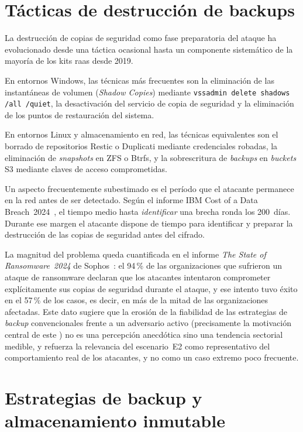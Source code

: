 \documentclass[../main.tex]{subfiles}
\begin{document}
\section{Tácticas de destrucción de backups}
\label{sec:destruccion-backups}

La destrucción de copias de seguridad como fase preparatoria del ataque
ha evolucionado desde una táctica ocasional hasta un componente sistemático
de la mayoría de los kits \gls{raas} desde 2019.

En entornos Windows, las técnicas más frecuentes son la eliminación de las
instantáneas de volumen (\textit{Shadow Copies}) mediante \texttt{vssadmin
delete shadows /all /quiet}, la desactivación del servicio de copia de
seguridad y la eliminación de los puntos de restauración del sistema.

En entornos Linux y almacenamiento en red, las técnicas equivalentes son
el borrado de repositorios Restic o Duplicati mediante credenciales robadas,
la eliminación de \textit{snapshots} en ZFS o Btrfs, y la sobrescritura de
\textit{backups} en \textit{buckets} S3 mediante claves de acceso
comprometidas.

Un aspecto frecuentemente subestimado es el período que el atacante
permanece en la red antes de ser detectado. Según el informe IBM Cost of a
Data Breach~2024~\cite{ibmcost2024}, el tiempo medio hasta \emph{identificar}
una brecha ronda los 200~días. Durante ese margen el atacante dispone de tiempo
para identificar y preparar la destrucción de las copias de seguridad antes del
cifrado.

La magnitud del problema queda cuantificada en el informe
\emph{The State of Ransomware~2024} de Sophos~\cite{sophos2024}: el 94\,\%
de las organizaciones que sufrieron un ataque de ransomware declaran que los
atacantes intentaron comprometer explícitamente sus copias de seguridad durante
el ataque, y ese intento tuvo éxito en el 57\,\% de los casos, es decir, en más
de la mitad de las organizaciones afectadas. Este dato sugiere que la erosión de
la fiabilidad de las estrategias de \emph{backup} convencionales frente a un
adversario activo (precisamente la motivación central de este \pfg) no es
una percepción anecdótica sino una tendencia sectorial medible, y refuerza la
relevancia del escenario~E2 como representativo del comportamiento real de los
atacantes, y no como un caso extremo poco frecuente.

\section{Estrategias de backup y almacenamiento inmutable}
\end{document}
